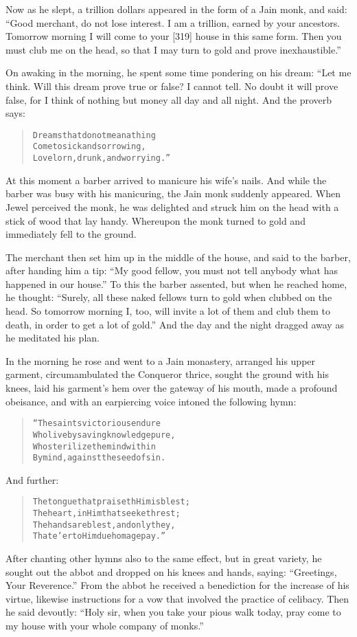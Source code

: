 \documentclass[article, twoside, 14pt]{memoir}
\renewenvironment{verbatim}{%
\begin{quote}%
\vskip -10pt%
\begin{alltt}\normalfont\large}{\end{alltt}%
\end{quote}%
\vskip -10pt
} %
\begin{document}
Now as he slept, a trillion dollars appeared in the form of a Jain
monk, and said:
``Good merchant, do not lose interest. I am a trillion, earned by your ancestors. Tomorrow morning I will come to your [319] house in this same form. Then you must club me on the head, so that I may turn to gold and prove inexhaustible.''

On awaking in the morning, he spent some time pondering on his
dream: “Let me think. Will this dream prove true or false? I cannot
tell. No doubt it will prove false, for I think of nothing but
money all day and all night. And the proverb says:

\begin{verbatim}
Dreams that do not mean a thing
Come to sick and sorrowing,
Lovelorn, drunk, and worrying.”
\end{verbatim}
At this moment a barber arrived to manicure his wife's nails. And
while the barber was busy with his manicuring, the Jain monk
suddenly appeared. When Jewel perceived the monk, he was delighted
and struck him on the head with a stick of wood that lay handy.
Whereupon the monk turned to gold and immediately fell to the
ground.

The merchant then set him up in the middle of the house, and said
to the barber, after handing him a tip:
``My good fellow, you must not tell anybody what has happened in our house.''
To this the barber assented, but when he reached home, he thought:
``Surely, all these naked fellows turn to gold when clubbed on the head. So tomorrow morning I, too, will invite a lot of them and club them to death, in order to get a lot of gold.''
And the day and the night dragged away as he meditated his plan.

In the morning he rose and went to a Jain monastery, arranged his
upper garment, circumambulated the Conqueror thrice, sought the
ground with his knees, laid his garment's hem over the gateway of
his mouth, made a profound obeisance, and with an earpiercing voice
intoned the following hymn:

\begin{verbatim}
“The saints victorious endure
Who live by saving knowledge pure,
Who sterilize the mind within
By mind, against the seed of sin.
\end{verbatim}
And further:

\begin{verbatim}
The tongue that praiseth Him is blest;
The heart, in Him that seeketh rest;
The hands are blest, and only they,
That e'er to Him due homage pay.”
\end{verbatim}
After chanting other hymns also to the same effect, but in great
variety, he sought out the abbot and dropped on his knees and
hands, saying: ``Greetings, Your Reverence.'' From the abbot he
received a benediction for the increase of his virtue, likewise
instructions for a vow that involved the practice of celibacy. Then
he said devoutly:
``Holy sir, when you take your pious walk today, pray come to my house with your whole company of monks.''
\end{document}

